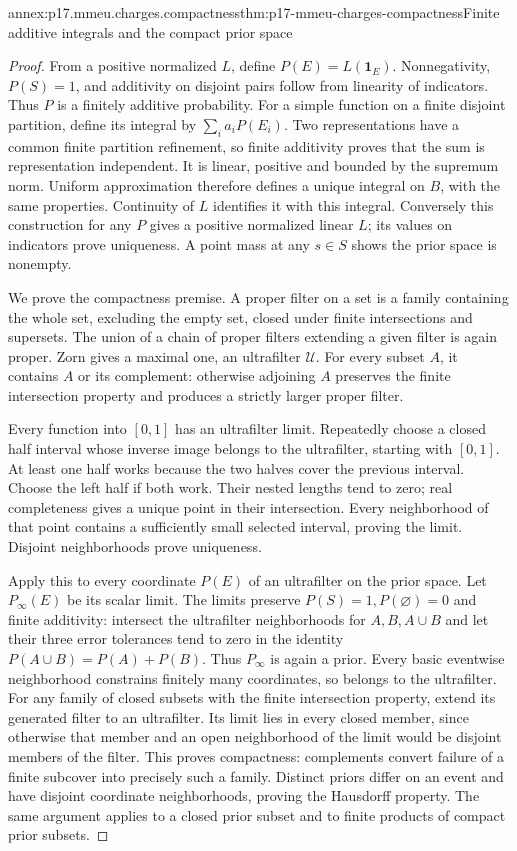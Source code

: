 \begin{annexitem}{annex:p17.mmeu.charges.compactness}{thm:p17-mmeu-charges-compactness}{Finite additive integrals and the compact prior space}
\begin{proof}
From a positive normalized \(L\), define
\(P(E)=L(\mathbf1_E)\).
Nonnegativity, \(P(S)=1\), and additivity
on disjoint pairs follow from linearity
of indicators. Thus \(P\) is a finitely
additive probability.
For a simple function on a finite disjoint
partition, define its integral by
\(\sum_i a_iP(E_i)\).
Two representations have a common finite
partition refinement, so finite additivity
proves that the sum is representation independent.
It is linear, positive and bounded by
the supremum norm. Uniform approximation
therefore defines a unique integral on \(B\),
with the same properties. Continuity of \(L\)
identifies it with this integral.
Conversely this construction for any \(P\)
gives a positive normalized linear \(L\);
its values on indicators prove uniqueness.
A point mass at any \(s\in S\) shows
the prior space is nonempty.

We prove the compactness premise.
A proper filter on a set is a family
containing the whole set, excluding the
empty set, closed under finite intersections
and supersets. The union of a chain of
proper filters extending a given filter
is again proper. Zorn gives a maximal
one, an ultrafilter \(\mathcal U\).
For every subset \(A\), it contains
\(A\) or its complement: otherwise
adjoining \(A\) preserves the finite
intersection property and produces a
strictly larger proper filter.

Every function into \([0,1]\) has an
ultrafilter limit. Repeatedly choose
a closed half interval whose inverse
image belongs to the ultrafilter,
starting with \([0,1]\). At least
one half works because the two
halves cover the previous interval.
Choose the left half if both work.
Their nested lengths tend to zero;
real completeness gives a unique
point in their intersection.
Every neighborhood of that point
contains a sufficiently small selected
interval, proving the limit.
Disjoint neighborhoods prove uniqueness.

Apply this to every coordinate \(P(E)\)
of an ultrafilter on the prior space.
Let \(P_\infty(E)\) be its scalar limit.
The limits preserve \(P(S)=1,P(\varnothing)=0\)
and finite additivity: intersect the
ultrafilter neighborhoods for \(A,B,A\cup B\)
and let their three error tolerances
tend to zero in the identity
\(P(A\cup B)=P(A)+P(B)\).
Thus \(P_\infty\) is again a prior.
Every basic eventwise neighborhood
constrains finitely many coordinates,
so belongs to the ultrafilter.
For any family of closed subsets
with the finite intersection property,
extend its generated filter to an
ultrafilter. Its limit lies in every
closed member, since otherwise that
member and an open neighborhood of
the limit would be disjoint members
of the filter. This proves compactness:
complements convert failure of a
finite subcover into precisely such
a family. Distinct priors differ
on an event and have disjoint
coordinate neighborhoods, proving
the Hausdorff property.
The same argument applies to a
closed prior subset and to finite
products of compact prior subsets.


\end{proof}
\end{annexitem}
